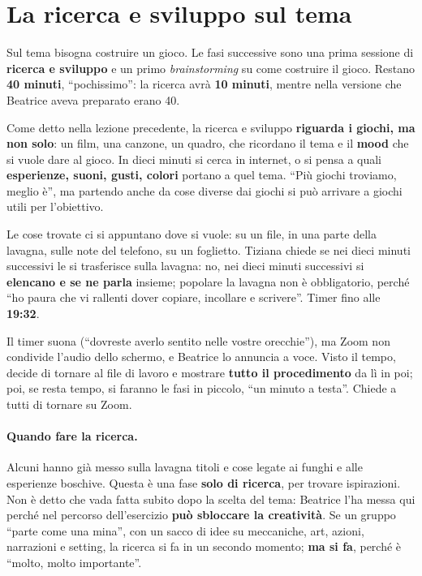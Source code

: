 \section{La ricerca e sviluppo sul tema}
\label{a7:sec:ricerca}

Sul tema bisogna costruire un gioco. Le fasi successive sono una prima sessione di
\textbf{ricerca e sviluppo} e un primo \emph{brainstorming} su come costruire il
gioco. Restano \textbf{40 minuti}, ``pochissimo'': la ricerca avrà \textbf{10
minuti}, mentre nella versione che Beatrice aveva preparato erano 40.

Come detto nella lezione precedente, la ricerca e sviluppo \textbf{riguarda i giochi,
ma non solo}: un film, una canzone, un quadro, che ricordano il tema e il
\textbf{mood} che si vuole dare al gioco. In dieci minuti si cerca in internet, o si
pensa a quali \textbf{esperienze, suoni, gusti, colori} portano a quel tema. ``Più
giochi troviamo, meglio è'', ma partendo anche da cose diverse dai giochi si può
arrivare a giochi utili per l'obiettivo.

Le cose trovate ci si appuntano dove si vuole: su un file, in una parte della
lavagna, sulle note del telefono, su un foglietto. Tiziana chiede se nei dieci minuti
successivi le si trasferisce sulla lavagna: no, nei dieci minuti successivi si
\textbf{elencano e se ne parla} insieme; popolare la lavagna non è obbligatorio,
perché ``ho paura che vi rallenti dover copiare, incollare e scrivere''. Timer fino
alle \textbf{19:32}.

Il timer suona (``dovreste averlo sentito nelle vostre orecchie''), ma Zoom non
condivide l'audio dello schermo, e Beatrice lo annuncia a voce. Visto il tempo, decide
di tornare al file di lavoro e mostrare \textbf{tutto il procedimento} da lì in poi;
poi, se resta tempo, si faranno le fasi in piccolo, ``un minuto a testa''. Chiede a
tutti di tornare su Zoom.

\paragraph{Quando fare la ricerca.} Alcuni hanno già messo sulla lavagna titoli e
cose legate ai funghi e alle esperienze boschive. Questa è una fase \textbf{solo di
ricerca}, per trovare ispirazioni. Non è detto che vada fatta subito dopo la scelta
del tema: Beatrice l'ha messa qui perché nel percorso dell'esercizio \textbf{può
sbloccare la creatività}. Se un gruppo ``parte come una mina'', con un sacco di idee
su meccaniche, art, azioni, narrazioni e setting, la ricerca si fa in un secondo
momento; \textbf{ma si fa}, perché è ``molto, molto importante''.

